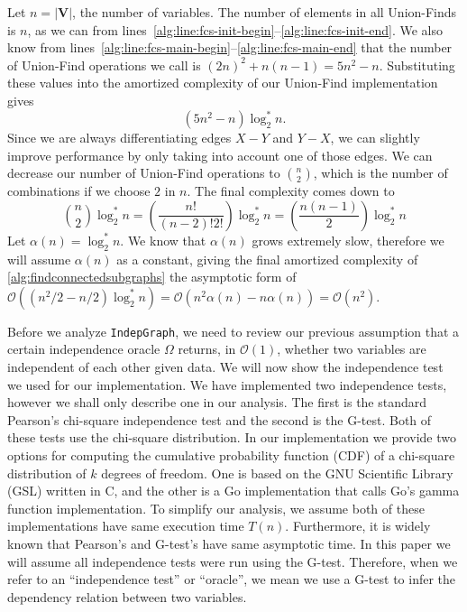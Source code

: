 \documentclass{amsart}
\theoremstyle{plain}
\numberwithin{equation}{section}
\newcommand{\set}[1]{\mathbf{#1}}
\newcommand{\bigo}{\mathcal{O}}
\newcommand{\code}[1]{\lstinline[mathescape=true]{#1}}
\begin{document}
Let $n=|\set{V}|$, the number of variables. The number of elements in all Union-Finds is
$n$, as we can from lines~\ref{alg:line:fcs-init-begin}--\ref{alg:line:fcs-init-end}. We also know
from lines~\ref{alg:line:fcs-main-begin}--\ref{alg:line:fcs-main-end} that the number of Union-Find
operations we call is ${(2n)}^2+n(n-1)=5n^2-n$. Substituting these values into the amortized
complexity of our Union-Find implementation gives
\begin{equation*}
  (5n^2-n)\log_2^*n.
\end{equation*}
Since we are always differentiating edges $X-Y$ and $Y-X$, we can slightly improve performance by
only taking into account one of those edges. We can decrease our number of Union-Find operations to
$\binom{n}{2}$, which is the number of combinations if we choose $2$ in $n$. The final complexity
comes down to
\begin{equation*}
  \binom{n}{2}\log_2^*n=\left(\frac{n!}{(n-2)!2!}\right)\log_2^*n=\left(\frac{n(n-1)}{2}\right)
    \log_2^*n
\end{equation*}
Let $\alpha(n)=\log_2^*n$. We know that $\alpha(n)$ grows extremely slow, therefore we will assume
$\alpha(n)$ as a constant, giving the final amortized complexity of
\autoref{alg:findconnectedsubgraphs} the asymptotic form of $\bigo((n^2/2-n/2)\log_2^*n)=
\bigo(n^2\alpha(n)-n\alpha(n))=\bigo(n^2)$.

Before we analyze \code{IndepGraph}, we need to review our previous assumption that a certain
independence oracle $\Omega$ returns, in $\bigo(1)$, whether two variables are independent of each
other given data. We will now show the independence test we used for our implementation. We have
implemented two independence tests, however we shall only describe one in our analysis. The first
is the standard Pearson's chi-square independence test and the second is the G-test. Both of these
tests use the chi-square distribution. In our implementation we provide two options for computing
the cumulative probability function (CDF) of a chi-square distribution of $k$ degrees of freedom.
One is based on the GNU Scientific Library (GSL) written in C, and the other is a Go implementation
that calls Go's gamma function implementation. To simplify our analysis, we assume both of these
implementations have same execution time $T(n)$. Furthermore, it is widely known that Pearson's and
G-test's have same asymptotic time. In this paper we will assume all independence tests were run
using the G-test. Therefore, when we refer to an ``independence test'' or ``oracle'', we mean we
use a G-test to infer the dependency relation between two variables.
\end{document}
